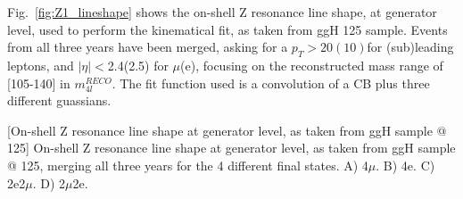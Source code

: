 Fig.~\ref{fig:Z1_lineshape} shows the on-shell Z resonance line shape, at generator level, 
used to perform the kinematical fit, as taken from ggH 125 \GeV sample. 
Events from all three years have been merged, asking for a 
$p_T > 20(10)$\GeV for (sub)leading leptons, and $|\eta|<$2.4(2.5) for $\mu$(e), focusing on
the reconstructed mass range of [105-140] \GeV in $m_{4l}^{RECO}$. The fit function used is a convolution
of a CB plus three different guassians.
\begin{multiFigure}
    \centering
        [On-shell Z resonance line shape at generator level, as taken from ggH sample @ 125\GeV]
        {On-shell Z resonance line shape at generator level, as taken from ggH sample @ 125\GeV, %
        merging all three years for the 4 different final states.
        \;A) 4$\mu$.
        \;B) 4e.
        \;C) 2e2$\mu$.
        \;D) 2$\mu$2e.}
    \label{fig:Z1_lineshape}
\end{multiFigure}

